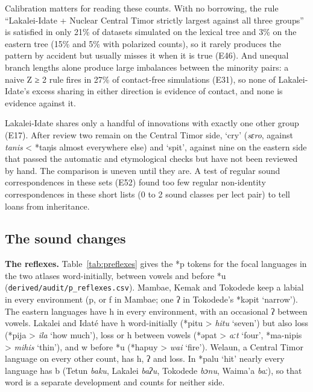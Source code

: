 \documentclass[11pt]{article}
\begin{document}
Calibration matters for reading these counts. With no borrowing, the rule ``Lakalei-Idate + Nuclear Central Timor strictly largest against all three groups'' is satisfied in only 21\% of datasets simulated on the lexical tree and 3\% on the eastern tree (15\% and 5\% with polarized counts), so it rarely produces the pattern by accident but usually misses it when it is true (E46). And unequal branch lengths alone produce large imbalances between the minority pairs: a naive Z ≥ 2 rule fires in 27\% of contact-free simulations (E31), so none of Lakalei-Idate's excess sharing in either direction is evidence of contact, and none is evidence against it.

Lakalei-Idate shares only a handful of innovations with exactly one other group (E17). After review two remain on the Central Timor side, `cry' (\emph{sɛro}, against \emph{tanis} \textless{} *taŋis almost everywhere else) and `spit', against nine on the eastern side that passed the automatic and etymological checks but have not been reviewed by hand. The comparison is uneven until they are. A test of regular sound correspondences in these sets (E52) found too few regular non-identity correspondences in these short lists (0 to 2 sound classes per lect pair) to tell loans from inheritance.

\subsection{The sound changes}

\textbf{The reflexes.} Table~\ref{tab:preflexes} gives the *p tokens for the focal languages in the two atlases word-initially, between vowels and before *u (\texttt{derived/audit/p\_reflexes.csv}). Mambae, Kemak and Tokodede keep a labial in every environment (p, or f in Mambae; one ʔ in Tokodede's *kəpit `narrow'). The eastern languages have h in every environment, with an occasional ʔ between vowels. Lakalei and Idaté have h word-initially (*pitu \textgreater{} \emph{hitu} `seven') but also loss (*pija \textgreater{} \emph{ila} `how much'), loss or h between vowels (*əpat \textgreater{} \emph{aːt} `four', *ma-nipis \textgreater{} \emph{mihis} `thin'), and w before *u (*hapuy \textgreater{} \emph{wai} `fire'). Welaun, a Central Timor language on every other count, has h, ʔ and loss. In *palu `hit' nearly every language has b (Tetun \emph{baku}, Lakalei \emph{baʔu}, Tokodede \emph{bɔnu}, Waima'a \emph{baː}), so that word is a separate development and counts for neither side.
\end{document}
